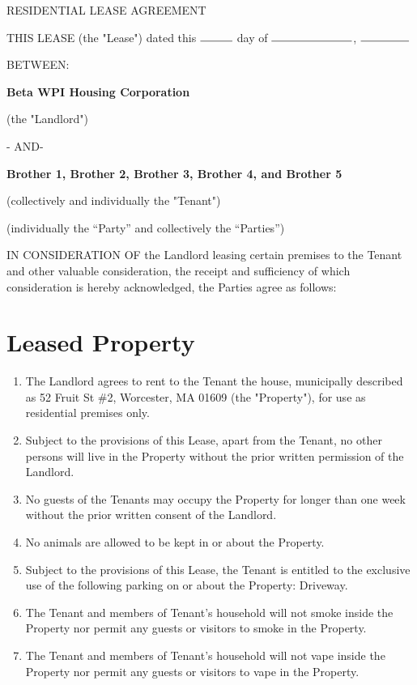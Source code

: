 \documentclass[12pt]{article}
\begin{document}
\begin{center}
RESIDENTIAL LEASE AGREEMENT
\end{center}

THIS LEASE (the "Lease") dated this $\rule{1cm}{0.15mm}$ day of
$\rule{2.5cm}{0.15mm}$, $\rule{1.5cm}{0.15mm}$

BETWEEN:

\begin{center}
\textbf{Beta WPI Housing Corporation}

(the "Landlord")

- AND-

\textbf{Brother 1, Brother 2, Brother 3, Brother 4, and Brother 5}

(collectively and individually the "Tenant")

(individually the “Party” and collectively the “Parties”)
\end{center}

IN CONSIDERATION OF the Landlord leasing certain premises to the Tenant and
other valuable consideration, the receipt and sufficiency of which
consideration is hereby acknowledged, the Parties agree as follows:

\section*{Leased Property}

\begin{enumerate}

    \item The Landlord agrees to rent to the Tenant the house, municipally
	    described as 52 Fruit St \#2, Worcester, MA 01609 (the "Property"),
		for use as residential premises only.  
    \item Subject to the provisions of this Lease, apart from the Tenant, no
	    other persons will live in the Property without the prior written
		permission of the Landlord.
    \item No guests of the Tenants may occupy the Property for longer than one
	    week without the prior written consent of the Landlord.
    \item No animals are allowed to be kept in or about the Property.
    \item Subject to the provisions of this Lease, the Tenant is entitled to
	    the exclusive use of the following parking on or about the
		Property: Driveway.
    \item The Tenant and members of Tenant's household will not smoke inside
	    the Property nor permit any guests or visitors to smoke in the
		Property.
    \item The Tenant and members of Tenant's household will not vape inside the
	    Property nor permit any guests or visitors to vape in the Property.

\end{enumerate}
    
\end{document}
